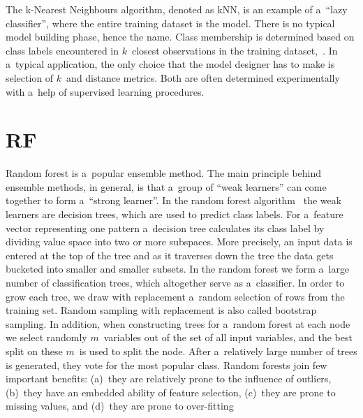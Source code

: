 The k-Nearest Neighbours algorithm, denoted as kNN, is an example of a~``lazy classifier'', where the entire training dataset is the model. There is no typical model building phase, hence the name. Class membership is determined based on class labels encountered in $k$~closest observations in the training dataset,~\cite{Altman1992}. In a~typical application, the only choice that the model designer has to make is selection of $k$~and distance metrics. Both are often determined experimentally with a~help of supervised learning procedures.

\section{RF}

Random forest is a~popular ensemble method. The main principle behind ensemble methods, in general, is that a~group of ``weak learners'' can come together to form a~``strong learner''. In the random forest algorithm~\cite{Breiman2001} the weak learners are decision trees, which are used to predict class labels. For a~feature vector representing one pattern a~decision tree calculates its class label by dividing value space into two or more subspaces. More precisely, an input data is entered at the top of the tree and as it traverses down the tree the data gets bucketed into smaller and smaller subsets. In the random forest we form a~large number of classification trees, which altogether serve as a~classifier. In order to grow each tree, we draw with replacement a~random selection of rows from the training set. Random sampling with replacement is also called bootstrap sampling. In addition, when constructing trees for a~random forest at each node we select randomly $m$~variables out of the set of all input variables, and the best split on these $m$~is used to split the node. After a~relatively large number of trees is generated, they vote for the most popular class. Random forests join few important benefits: (a)~they are relatively prone to the influence of outliers, (b)~they have an embedded ability of feature selection, (c)~they are prone to missing values, and (d)~they are prone to over-fitting